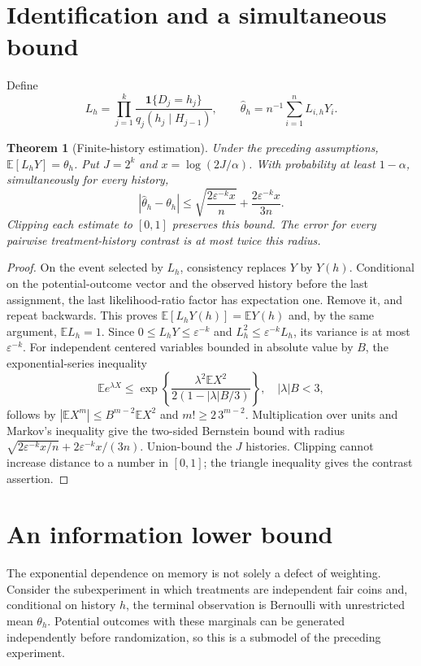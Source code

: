 \documentclass[11pt,a4paper]{article}
\newtheorem{theorem}{Theorem}[section]
\theoremstyle{remark}
\newcommand{\E}{\mathbb E}
\newcommand{\ind}{\mathbf 1}
\begin{document}
\section{Identification and a simultaneous bound}
Define
\[
 L_h=\prod_{j=1}^k\frac{\ind\{D_j=h_j\}}{q_j(h_j\mid H_{j-1})},\qquad
 \widehat\theta_h=n^{-1}\sum_{i=1}^nL_{i,h}Y_i.
\]
\begin{theorem}[Finite-history estimation]
Under the preceding assumptions, $\E[L_hY]=\theta_h$. Put $J=2^k$ and $x=\log(2J/\alpha)$. With probability at least $1-\alpha$, simultaneously for every history,
\[
 |\widehat\theta_h-\theta_h|
 \le \sqrt{\frac{2\varepsilon^{-k}x}{n}}
       +\frac{2\varepsilon^{-k}x}{3n}.
\]
Clipping each estimate to $[0,1]$ preserves this bound. The error for every pairwise treatment-history contrast is at most twice this radius.
\end{theorem}
\begin{proof}
On the event selected by $L_h$, consistency replaces $Y$ by $Y(h)$. Conditional on the potential-outcome vector and the observed history before the last assignment, the last likelihood-ratio factor has expectation one. Remove it, and repeat backwards. This proves $\E[L_hY(h)]=\E Y(h)$ and, by the same argument, $\E L_h=1$. Since $0\le L_hY\le\varepsilon^{-k}$ and $L_h^2\le\varepsilon^{-k}L_h$, its variance is at most $\varepsilon^{-k}$. For independent centered variables bounded in absolute value by $B$, the exponential-series inequality
\[
 \E e^{\lambda X}\le
 \exp\left\{\frac{\lambda^2\E X^2}{2(1-|\lambda|B/3)}\right\},\quad |\lambda|B<3,
\]
follows by $|\E X^m|\le B^{m-2}\E X^2$ and $m!\ge2\,3^{m-2}$. Multiplication over units and Markov's inequality give the two-sided Bernstein bound with radius $\sqrt{2\varepsilon^{-k}x/n}+2\varepsilon^{-k}x/(3n)$. Union-bound the $J$ histories. Clipping cannot increase distance to a number in $[0,1]$; the triangle inequality gives the contrast assertion.
\end{proof}

\section{An information lower bound}
The exponential dependence on memory is not solely a defect of weighting. Consider the subexperiment in which treatments are independent fair coins and, conditional on history $h$, the terminal observation is Bernoulli with unrestricted mean $\theta_h$. Potential outcomes with these marginals can be generated independently before randomization, so this is a submodel of the preceding experiment.
\end{document}
